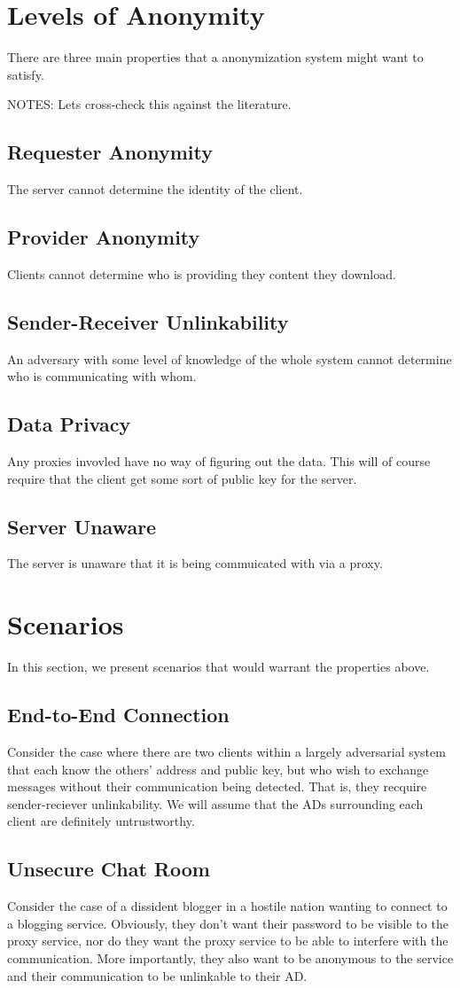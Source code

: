 \documentclass{article}
\begin{document}
\section{Levels of Anonymity}
There are three main properties that a anonymization system might want to satisfy.

NOTES: Lets cross-check this against the literature.
\subsection{Requester Anonymity}
The server cannot determine the identity of the client.
\subsection{Provider Anonymity}
Clients cannot determine who is providing they content they download.
\subsection{Sender-Receiver Unlinkability}
An adversary with some level of knowledge of the whole system cannot determine who is communicating with whom.
\subsection{Data Privacy}
Any proxies invovled have no way of figuring out the data.  This will of course require that the client get some sort of public key for the server.
\subsection{Server Unaware}
The server is unaware that it is being commuicated with via a proxy.
\section{Scenarios}
In this section, we present scenarios that would warrant the properties above.
\subsection{End-to-End Connection}
Consider the case where there are two clients within a largely adversarial system that each know the others' address and public key, but who wish to exchange messages without their communication being detected.  That is, they recquire sender-reciever unlinkability.  We will assume that the ADs surrounding each client are definitely untrustworthy.
\subsection{Unsecure Chat Room}
Consider the case of a dissident blogger in a hostile nation wanting to connect to a blogging service.  Obviously, they don't want their password to be visible to the proxy service, nor do they want the proxy service to be able to interfere with the communication.  More importantly, they also want to be anonymous to the service and their communication to be unlinkable to their AD.
\end{document}
